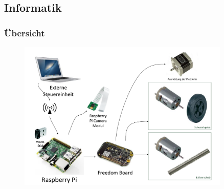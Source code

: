 \subsection{Informatik}

\author{Alexander Suter}

\begin{frame}
	\frametitle{Übersicht\hfill{}\footnotesize \group}

		\begin{figure}
			\centering
			\includegraphics[width=0.9\textwidth]{../../fig/blockdiagramm-fuer-presi.pdf}
		\end{figure}
		
		
		
		
		
		

\end{frame}

